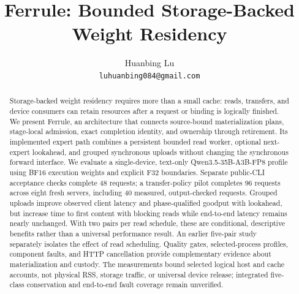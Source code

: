 \documentclass[11pt,letterpaper]{article}
\title{Ferrule: Bounded Storage-Backed Weight Residency}
\author{Huanbing Lu\\\texttt{luhuanbing084@gmail.com}}
\date{}
\newcommand{\system}{Ferrule}
\begin{document}
\maketitle

\begin{abstract}
Storage-backed weight residency requires more than a small cache: reads,
transfers, and device consumers can retain resources after a request or binding
is logically finished. We present \system{}, an architecture that connects
source-bound materialization plans, stage-local admission, exact completion
identity, and ownership through retirement. Its implemented expert path combines
a persistent bounded read worker, optional next-expert lookahead, and grouped
synchronous uploads without changing the synchronous forward interface.
We evaluate a single-device, text-only Qwen3.5-35B-A3B-FP8 profile using
BF16 execution weights and explicit F32 boundaries. Separate public-CLI
acceptance checks complete 48 requests; a transfer-policy pilot completes
96 requests across eight fresh servers, including 40 measured, output-checked
requests. Grouped uploads improve observed client latency and phase-qualified
goodput with lookahead, but increase time to first content with blocking reads
while end-to-end latency remains nearly unchanged. With two pairs per read
schedule, these are conditional, descriptive benefits rather than a universal
performance result. An earlier five-pair study separately isolates the effect
of read scheduling. Quality gates, selected-process profiles, component faults,
and HTTP cancellation provide complementary evidence about materialization and
custody. The measurements bound selected logical host and cache accounts, not
physical RSS, storage traffic, or universal device release; integrated
five-class conservation and end-to-end fault coverage remain unverified.
\end{abstract}












\clearpage
\appendix

\end{document}
